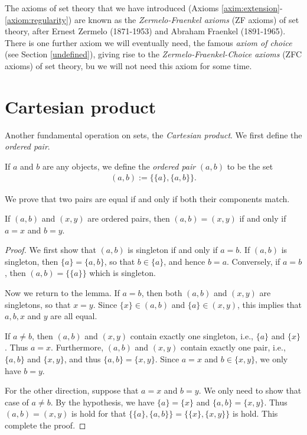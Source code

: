 \begin{remark}
    The axioms of set theory that we have introduced (Axioms \ref{axim:extension}-\ref{axiom:regularity}) are known as the \emph{Zermelo-Fraenkel axioms} (ZF axioms) of set theory, after Ernest Zermelo (1871-1953) and Abraham Fraenkel (1891-1965). There is one further axiom we will eventually need, the famous \emph{axiom of choice} (see Section \ref{undefined}), giving rise to the \emph{Zermelo-Fraenkel-Choice axioms} (ZFC axioms) of set theory, bu we will not need this axiom for some time.
\end{remark}

\section{Cartesian product}

Another fundamental operation on sets, the \emph{Cartesian product}. We first define the \emph{ordered pair}.

\begin{definition}
    If $a$ and $b$ are any objects, we define the \emph{ordered pair} $(a, b)$ to be the set
    \begin{align*}
        (a, b) := \{\{a\}, \{a, b\}\}.
    \end{align*}
\end{definition}

We prove that two pairs are equal if and only if both their components match.

\begin{lemma}
    If $(a, b)$ and $(x, y)$ are ordered pairs, then $(a, b) = (x, y)$ if and only if $a = x$ and $b = y$.
\end{lemma}

\begin{proof}
    We first show that $(a, b)$ is singleton if and only if $a = b$. If $(a, b)$ is singleton, then $\{a\} = \{a, b\}$, so that $b \in \{a\}$, and hence $b = a$. Conversely, if $a = b$, then $(a, b) = \{\{a\}\}$ which is singleton.

    Now we return to the lemma. If $a = b$, then both $(a, b)$ and $(x, y)$ are singletons, so that $x = y$. Since $\{x\} \in (a, b)$ and $\{a\} \in (x, y)$, this implies that $a, b, x$ and $y$ are all equal.

    If $a \neq b$, then $(a, b)$ and $(x, y)$ contain exactly one singleton, i.e., $\{a\}$ and $\{x\}$. Thus $a = x$. Furthermore, $(a, b)$ and $(x, y)$ contain exactly one pair, i.e., $\{a, b\}$ and $\{x, y\}$, and thus $\{a, b\} = \{x, y\}$. Since $a = x$ and $b \in \{x, y\}$, we only have $b = y$.

    For the other direction, suppose that $a = x$ and $b = y$. We only need to show that case of $a \neq b$. By the hypothesis, we have $\{a\} = \{x\}$ and $\{a, b\} = \{x, y\}$. Thus $(a, b) = (x, y)$ is hold for that $\{\{a\}, \{a, b\}\} = \{\{x\}, \{x, y\}\}$ is hold. This complete the proof.
\end{proof}

